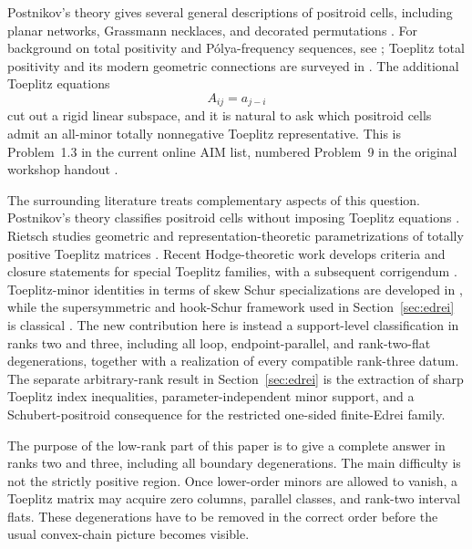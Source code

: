 \documentclass{amsart}
\numberwithin{equation}{section}
\theoremstyle{definition}
\theoremstyle{remark}
\begin{document}
Postnikov's theory gives several general descriptions of positroid cells, including planar networks, Grassmann necklaces, and decorated permutations \cite{Postnikov}.  For background on total positivity and P\'olya-frequency sequences, see \cite{Karlin,FJ}; Toeplitz total positivity and its modern geometric connections are surveyed in \cite{Rietsch,RietschSurvey}.  The additional Toeplitz equations
\[
 A_{ij}=a_{j-i}
\]
cut out a rigid linear subspace, and it is natural to ask which positroid cells admit an all-minor totally nonnegative Toeplitz representative.  This is Problem~1.3 in the current online AIM list, numbered Problem~9 in the original workshop handout \cite{AIM}.

The surrounding literature treats complementary aspects of this question.  Postnikov's theory classifies positroid cells without imposing Toeplitz equations \cite{Postnikov}.  Rietsch studies geometric and representation-theoretic parametrizations of totally positive Toeplitz matrices \cite{Rietsch,RietschSurvey}.  Recent Hodge-theoretic work develops criteria and closure statements for special Toeplitz families, with a subsequent corrigendum \cite{HigherLorentzian,HigherLorentzianCorrigendum,McDaniel}.  Toeplitz-minor identities in terms of skew Schur specializations are developed in \cite{GarciaTierz}, while the supersymmetric and hook-Schur framework used in Section~\ref{sec:edrei} is classical \cite{BereleRegev,Stembridge,Macdonald}.  The new contribution here is instead a support-level classification in ranks two and three, including all loop, endpoint-parallel, and rank-two-flat degenerations, together with a realization of every compatible rank-three datum.  The separate arbitrary-rank result in Section~\ref{sec:edrei} is the extraction of sharp Toeplitz index inequalities, parameter-independent minor support, and a Schubert-positroid consequence for the restricted one-sided finite-Edrei family.

The purpose of the low-rank part of this paper is to give a complete answer in ranks two and three, including all boundary degenerations.  The main difficulty is not the strictly positive region.  Once lower-order minors are allowed to vanish, a Toeplitz matrix may acquire zero columns, parallel classes, and rank-two interval flats.  These degenerations have to be removed in the correct order before the usual convex-chain picture becomes visible.
\end{document}
